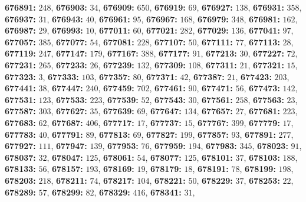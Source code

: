 \textsf{\bfseries 676891:} $248$, \textsf{\bfseries 676903:} $34$, \textsf{\bfseries 676909:} $650$, \textsf{\bfseries 676919:} $69$, \textsf{\bfseries 676927:} $138$, \textsf{\bfseries 676931:} $358$, \textsf{\bfseries 676937:} $31$, \textsf{\bfseries 676943:} $40$, \textsf{\bfseries 676961:} $95$, \textsf{\bfseries 676967:} $168$, \textsf{\bfseries 676979:} $348$, \textsf{\bfseries 676981:} $162$, \textsf{\bfseries 676987:} $29$, \textsf{\bfseries 676993:} $10$, \textsf{\bfseries 677011:} $60$, \textsf{\bfseries 677021:} $282$, \textsf{\bfseries 677029:} $136$, \textsf{\bfseries 677041:} $97$, \textsf{\bfseries 677057:} $385$, \textsf{\bfseries 677077:} $54$, \textsf{\bfseries 677081:} $228$, \textsf{\bfseries 677107:} $50$, \textsf{\bfseries 677111:} $77$, \textsf{\bfseries 677113:} $28$, \textsf{\bfseries 677119:} $247$, \textsf{\bfseries 677147:} $179$, \textsf{\bfseries 677167:} $388$, \textsf{\bfseries 677177:} $91$, \textsf{\bfseries 677213:} $30$, \textsf{\bfseries 677227:} $72$, \textsf{\bfseries 677231:} $265$, \textsf{\bfseries 677233:} $26$, \textsf{\bfseries 677239:} $132$, \textsf{\bfseries 677309:} $108$, \textsf{\bfseries 677311:} $21$, \textsf{\bfseries 677321:} $15$, \textsf{\bfseries 677323:} $3$, \textsf{\bfseries 677333:} $103$, \textsf{\bfseries 677357:} $80$, \textsf{\bfseries 677371:} $42$, \textsf{\bfseries 677387:} $21$, \textsf{\bfseries 677423:} $203$, \textsf{\bfseries 677441:} $38$, \textsf{\bfseries 677447:} $240$, \textsf{\bfseries 677459:} $702$, \textsf{\bfseries 677461:} $90$, \textsf{\bfseries 677471:} $56$, \textsf{\bfseries 677473:} $142$, \textsf{\bfseries 677531:} $123$, \textsf{\bfseries 677533:} $223$, \textsf{\bfseries 677539:} $52$, \textsf{\bfseries 677543:} $30$, \textsf{\bfseries 677561:} $258$, \textsf{\bfseries 677563:} $23$, \textsf{\bfseries 677587:} $303$, \textsf{\bfseries 677627:} $35$, \textsf{\bfseries 677639:} $69$, \textsf{\bfseries 677647:} $134$, \textsf{\bfseries 677657:} $27$, \textsf{\bfseries 677681:} $223$, \textsf{\bfseries 677683:} $62$, \textsf{\bfseries 677687:} $406$, \textsf{\bfseries 677717:} $17$, \textsf{\bfseries 677737:} $15$, \textsf{\bfseries 677767:} $399$, \textsf{\bfseries 677779:} $17$, \textsf{\bfseries 677783:} $40$, \textsf{\bfseries 677791:} $89$, \textsf{\bfseries 677813:} $69$, \textsf{\bfseries 677827:} $199$, \textsf{\bfseries 677857:} $93$, \textsf{\bfseries 677891:} $277$, \textsf{\bfseries 677927:} $111$, \textsf{\bfseries 677947:} $139$, \textsf{\bfseries 677953:} $76$, \textsf{\bfseries 677959:} $194$, \textsf{\bfseries 677983:} $345$, \textsf{\bfseries 678023:} $91$, \textsf{\bfseries 678037:} $32$, \textsf{\bfseries 678047:} $125$, \textsf{\bfseries 678061:} $54$, \textsf{\bfseries 678077:} $125$, \textsf{\bfseries 678101:} $37$, \textsf{\bfseries 678103:} $188$, \textsf{\bfseries 678133:} $56$, \textsf{\bfseries 678157:} $193$, \textsf{\bfseries 678169:} $19$, \textsf{\bfseries 678179:} $18$, \textsf{\bfseries 678191:} $78$, \textsf{\bfseries 678199:} $198$, \textsf{\bfseries 678203:} $218$, \textsf{\bfseries 678211:} $74$, \textsf{\bfseries 678217:} $104$, \textsf{\bfseries 678221:} $50$, \textsf{\bfseries 678229:} $37$, \textsf{\bfseries 678253:} $22$, \textsf{\bfseries 678289:} $57$, \textsf{\bfseries 678299:} $82$, \textsf{\bfseries 678329:} $416$, \textsf{\bfseries 678341:} $31$, 
